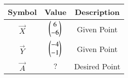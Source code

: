 \begin{tabular}{|c|c|c|}
     \hline
     \textbf{Symbol}& \textbf{Value} & \textbf{Description} \\
     \hline
     $\vec{X}$ & $\begin{pmatrix}6 \\ -6 \end{pmatrix}$ & Given Point \\ 
     \hline
     $\vec{Y}$  & $\begin{pmatrix}-4 \\ -1\end{pmatrix}$ & Given Point \\ 
     \hline
     $\vec{A}$ & $?$ & Desired Point \\ 
     \hline
\end{tabular}
